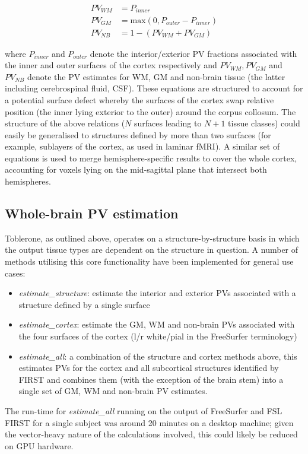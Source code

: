 \documentclass[12pt]{report}
\begin{document}
\begin{align}
PV_{WM} &= P_{inner} \\
PV_{GM} &= \mathrm{max}(0, P_{outer} - P_{inner}) \\
PV_{NB} &= 1 - (PV_{WM} + PV_{GM}) 
\end{align}

where $P_{inner}$ and $P_{outer}$ denote the interior/exterior PV fractions associated with the inner and outer surfaces of the cortex respectively and $PV_{WM}, PV_{GM}$ and $PV_{NB}$ denote the PV estimates for WM, GM and non-brain tissue (the latter including cerebrospinal fluid, CSF). These equations are structured to account for a potential surface defect whereby the surfaces of the cortex swap relative position (the inner lying exterior to the outer) around the corpus collosum. The structure of the above relations ($N$ surfaces leading to $N+1$ tissue classes) could easily be generalised to structures defined by more than two surfaces (for example, sublayers of the cortex, as used in laminar fMRI). A similar set of equations is used to merge hemisphere-specific results to cover the whole cortex, accounting for voxels lying on the mid-sagittal plane that intersect both hemispheres.

\subsection{Whole-brain PV estimation}
Toblerone, as outlined above, operates on a structure-by-structure basis in which the output tissue types are dependent on the structure in question. A number of methods utilising this core functionality have been implemented for general use cases: 
\begin{itemize}
	\item \textit{estimate\_structure}: estimate the interior and exterior PVs associated with a structure defined by a single surface
	\item \textit{estimate\_cortex}: estimate the GM, WM and non-brain PVs associated with the four surfaces of the cortex (l/r white/pial in the FreeSurfer terminology) 
	\item \textit{estimate\_all}: a combination of the structure and cortex methods above, this estimates PVs for the cortex and all subcortical structures identified by FIRST and combines them (with the exception of the brain stem) into a single set of GM, WM and non-brain PV estimates. 
\end{itemize}
The run-time for \textit{estimate\_all} running on the output of FreeSurfer and FSL FIRST for a single subject was around 20 minutes on a desktop machine; given the vector-heavy nature of the calculations involved, this could likely be reduced on GPU hardware. 
\end{document}
